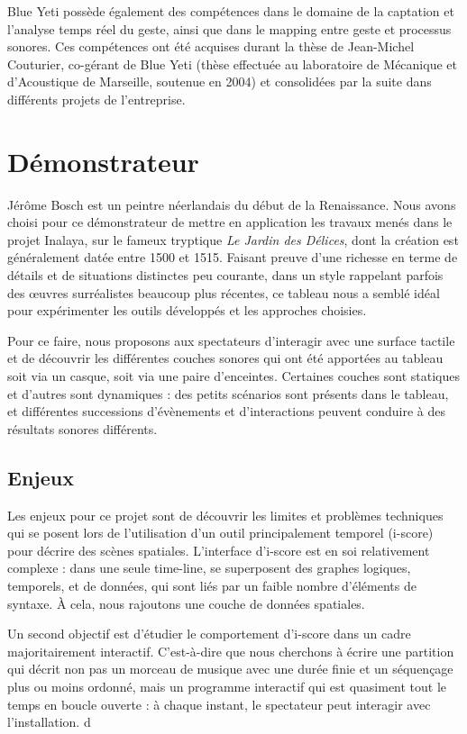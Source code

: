 \documentclass[french]{article}
\begin{document}
    Blue Yeti possède également des compétences dans le domaine de la captation et l’analyse temps 
    réel du geste, ainsi que dans le mapping entre geste et processus sonores. Ces compétences ont 
    été acquises durant la thèse de Jean-Michel Couturier, co-gérant de Blue Yeti (thèse effectuée au 
    laboratoire de Mécanique et d’Acoustique de Marseille, soutenue en 2004) et consolidées par la suite dans différents projets de l’entreprise.
    
    \section*{Démonstrateur}
    Jérôme Bosch est un peintre néerlandais du début de la Renaissance.
    Nous avons choisi pour ce démonstrateur de mettre en application les travaux menés dans le projet Inalaya, sur le fameux tryptique \emph{Le Jardin des Délices}, dont la création est généralement datée entre 1500 et 1515. 
    Faisant preuve d'une richesse en terme de détails et de situations distinctes peu courante, dans un style rappelant parfois des \oe uvres surréalistes beaucoup plus récentes, ce tableau nous a semblé idéal pour expérimenter les outils développés et les approches choisies.
    
    Pour ce faire, nous proposons aux spectateurs d'interagir avec une surface tactile et de découvrir les différentes couches sonores qui ont été apportées au tableau soit via un casque, soit via une paire d'enceintes.
    Certaines couches sont statiques et d'autres sont dynamiques : des petits scénarios sont présents dans le tableau, et différentes successions d'évènements et d'interactions peuvent conduire à des résultats sonores différents.
    
    \subsection*{Enjeux}
    Les enjeux pour ce projet sont de découvrir les limites et problèmes techniques qui se posent lors de l'utilisation d'un outil principalement temporel (i-score) pour décrire des scènes spatiales.
    L'interface d'i-score est en soi relativement complexe : dans une seule time-line, se superposent des graphes logiques, temporels, et de données, qui sont liés par un faible nombre d'éléments de syntaxe.
    À cela, nous rajoutons une couche de données spatiales.
    
    Un second objectif est d'étudier le comportement d'i-score dans un cadre majoritairement interactif.
    C'est-à-dire que nous cherchons à écrire une partition qui décrit non pas un morceau de musique avec une durée finie et un séquençage plus ou moins ordonné, mais un programme interactif qui est quasiment tout le temps en boucle ouverte : à chaque instant, le spectateur peut interagir avec l'installation. 
    d
    
\end{document}
